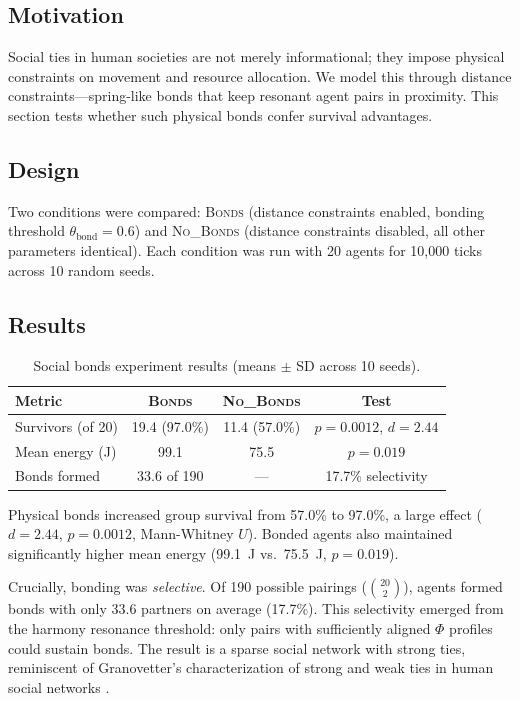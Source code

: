 \documentclass[12pt,a4paper]{article}
\begin{document}
\subsection{Motivation}

Social ties in human societies are not merely informational; they impose physical constraints on movement and resource allocation. We model this through distance constraints---spring-like bonds that keep resonant agent pairs in proximity. This section tests whether such physical bonds confer survival advantages.

\subsection{Design}

Two conditions were compared: \textsc{Bonds} (distance constraints enabled, bonding threshold $\theta_{\text{bond}} = 0.6$) and \textsc{No\_Bonds} (distance constraints disabled, all other parameters identical). Each condition was run with 20 agents for 10{,}000 ticks across 10 random seeds.

\subsection{Results}

\begin{table}[H]
\centering
\caption{Social bonds experiment results (means $\pm$ SD across 10 seeds).}
\label{tab:bonds}
\begin{tabular}{@{}lccc@{}}
\toprule
\textbf{Metric} & \textsc{Bonds} & \textsc{No\_Bonds} & \textbf{Test} \\
\midrule
Survivors (of 20)  & 19.4 (97.0\%) & 11.4 (57.0\%) & $p=0.0012$, $d=2.44$ \\
Mean energy (J)    & 99.1           & 75.5           & $p=0.019$ \\
Bonds formed       & 33.6 of 190    & ---            & 17.7\% selectivity \\
\bottomrule
\end{tabular}
\end{table}

Physical bonds increased group survival from 57.0\% to 97.0\%, a large effect ($d = 2.44$, $p = 0.0012$, Mann-Whitney $U$). Bonded agents also maintained significantly higher mean energy (99.1~J vs.\ 75.5~J, $p = 0.019$).

Crucially, bonding was \emph{selective}. Of 190 possible pairings ($\binom{20}{2}$), agents formed bonds with only 33.6 partners on average (17.7\%). This selectivity emerged from the harmony resonance threshold: only pairs with sufficiently aligned $\Phi$ profiles could sustain bonds. The result is a sparse social network with strong ties, reminiscent of Granovetter's characterization of strong and weak ties in human social networks \citep{granovetter1973}.
\end{document}
